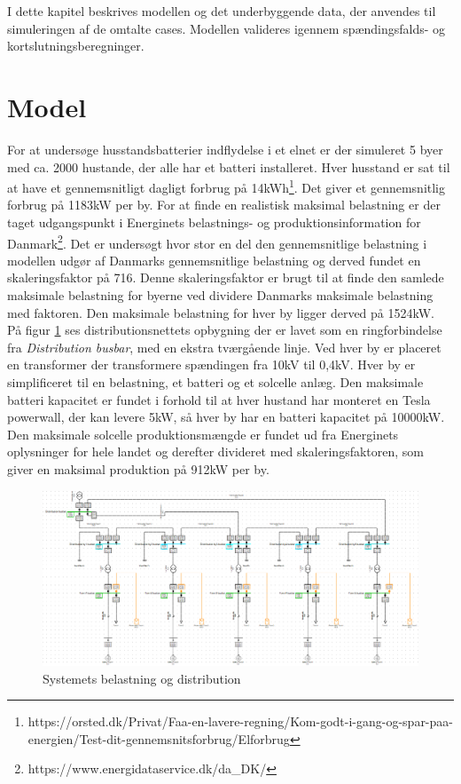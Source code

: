 

\label{Modelopbygning}
I dette kapitel beskrives modellen og det underbyggende data, der anvendes til simuleringen af de omtalte cases. Modellen valideres igennem spændingsfalds- og kortslutningsberegninger.

\section{Model}

For at undersøge husstandsbatterier indflydelse i et elnet er der simuleret 5 byer med ca. 2000 hustande, der alle har et batteri installeret. Hver husstand er sat til at have et gennemsnitligt dagligt forbrug på 14kWh\footnote{https://orsted.dk/Privat/Faa-en-lavere-regning/Kom-godt-i-gang-og-spar-paa-energien/Test-dit-gennemsnitsforbrug/Elforbrug}. Det giver et gennemsnitlig forbrug på 1183kW per by. For at finde en realistisk maksimal belastning er der taget udgangspunkt i Energinets belastnings- og produktionsinformation for Danmark\footnote{https://www.energidataservice.dk/da\_DK/}. Det er undersøgt hvor stor en del den gennemsnitlige belastning i modellen udgør af Danmarks gennemsnitlige belastning og derved fundet en skaleringsfaktor på 716. Denne skaleringsfaktor er brugt til at finde den samlede maksimale belastning for byerne ved dividere Danmarks maksimale belastning med faktoren. Den maksimale belastning for hver by ligger derved på 1524kW. \\
På figur \ref{fig:Simdis} ses distributionsnettets opbygning der er lavet som en ringforbindelse fra \textit{Distribution busbar}, med en ekstra tværgående linje. Ved hver by er placeret en transformer der transformere spændingen fra 10kV til 0,4kV. Hver by er simplificeret til en belastning, et batteri og et solcelle anlæg. Den maksimale batteri kapacitet er fundet i forhold til at hver hustand har monteret en Tesla powerwall, der kan levere 5kW, så hver by har en batteri kapacitet på 10000kW. Den maksimale solcelle produktionsmængde er fundet ud fra Energinets oplysninger for hele landet og derefter divideret med skaleringsfaktoren, som giver en maksimal produktion på 912kW per by. 

 
 \begin{figure}[H] %
 	\centering
 	\includegraphics[width=1\textwidth]{figurer/Sim_model_2}
 	\caption{Systemets belastning og distribution}
 	\label{fig:Simdis}
 \end{figure}
    

